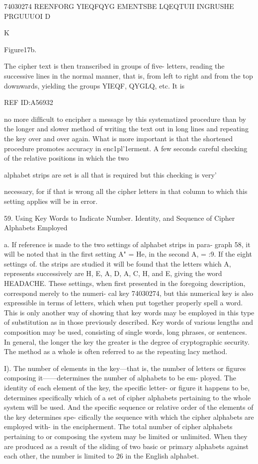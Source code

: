 { 

 

 

74030274
REENFORG
YIEQFQYG
EMENTSBE
LQEQTUII
INGRUSHE
PRGUUUOI
D

K

Figure17b.

The cipher text is then transcribed in groups of ﬁve- letters, reading
the successive lines in the normal manner, that is, from left to right and
from the top downwards, yielding the groups YIEQF, QYGLQ, etc. It is

 

REF ID:A56932

no more difﬁcult to encipher a message by this systematized procedure
than by the longer and slower method of writing the text out in long
lines and repeating the key over and over again. What is more important
is that the shortened procedure promotes accuracy in enc1pl'1erment. A
few seconds careful checking of the relative positions in which the two

alphabet strips are set is all that is required but this checking is very'

necessary, for if that is wrong all the cipher letters in that column to
which this setting applies will be in error.

59. Using Key Words to Indicate Number. Identity, and
Sequence of Cipher Alphabets Employed

a. If reference is made to the two settings of alphabet strips in para-
graph 58, it will be noted that in the ﬁrst setting A" = He, in the second
A, = :9. If the eight settings of. the strips are studied it will be found
that the letters which A, represents successively are H, E, A, D, A, C,
H, and E, giving the word HEADACHE. These settings, when ﬁrst
presented in the foregoing description, correspond merely to the numeri-
cal key 74030274, but this numerical key is also expressible in terms of
letters, which when put together properly spell a word. This is only
another way of showing that key words may be employed in this type of
substitution as in those previously described. Key words of various
lengths and composition may be used, consisting of single words, long
phrases, or sentences. In general, the longer the key the greater is the
degree of cryptographic security. The method as a whole is often
referred to as the repeating lacy method.

I). The number of elements in the key—that is, the number of letters
or ﬁgures composing it——determines the number of alphabets to be em-
ployed. The identity of each element of the key, the speciﬁc letter- or
ﬁgure it happens to be, determines speciﬁcally which of a set of cipher
alphabets pertaining to the whole system will be used. And the speciﬁc
sequence or relative order of the elements of the key determines spe-
ciﬁcally the sequence with which the cipher alphabets are employed with-
in the encipherment. The total number of cipher alphabets pertaining to
or composing the system may be limited or unlimited. When they are
produced as a result of the sliding of two basic or primary alphabets
against each other, the number is limited to 26 in the English alphabet.

}
